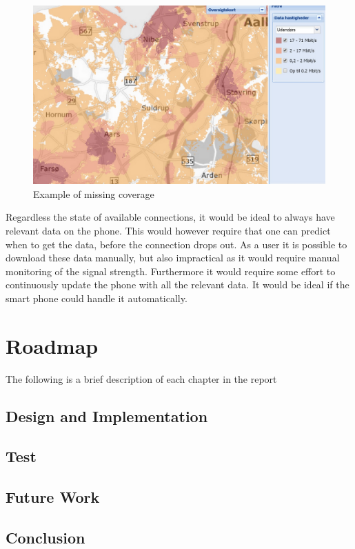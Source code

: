 \begin{figure}[H]
\centering
\includegraphics[width=\textwidth]{billeder/coverage}
\caption{Example of missing coverage}\label{visina8}
\label{fig:coveragemap}
\end{figure}

Regardless the state of available connections, it would be ideal to always have relevant data on the phone. This would however require that one can predict when to get the data, before the connection drops out. As a user it is possible to download these data manually, but also impractical as it would require manual monitoring of the signal strength. Furthermore it would require some effort to continuously update the phone with all the relevant data. It would be ideal if the smart phone could handle it automatically.






\section{Roadmap}
The following is a brief description of each chapter in the report

\subsection{Design and Implementation}
\subsection{Test}
\subsection{Future Work}
\subsection{Conclusion}